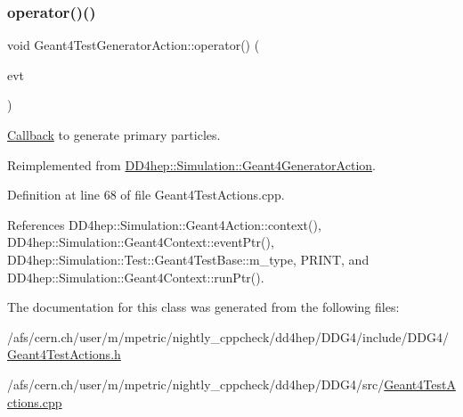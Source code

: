 \subsubsection{\texorpdfstring{operator()()}{operator()()}}
{\footnotesize\ttfamily void Geant4\+Test\+Generator\+Action\+::operator() (\begin{DoxyParamCaption}\item[{G4\+Event $\ast$}]{evt }\end{DoxyParamCaption})\hspace{0.3cm}{\ttfamily [virtual]}}



\hyperlink{class_d_d4hep_1_1_callback}{Callback} to generate primary particles. 



Reimplemented from \hyperlink{class_d_d4hep_1_1_simulation_1_1_geant4_generator_action_ac5a1d2335a19e3f9d555081199e01801}{D\+D4hep\+::\+Simulation\+::\+Geant4\+Generator\+Action}.



Definition at line 68 of file Geant4\+Test\+Actions.\+cpp.



References D\+D4hep\+::\+Simulation\+::\+Geant4\+Action\+::context(), D\+D4hep\+::\+Simulation\+::\+Geant4\+Context\+::event\+Ptr(), D\+D4hep\+::\+Simulation\+::\+Test\+::\+Geant4\+Test\+Base\+::m\+\_\+type, P\+R\+I\+NT, and D\+D4hep\+::\+Simulation\+::\+Geant4\+Context\+::run\+Ptr().



The documentation for this class was generated from the following files\+:\begin{DoxyCompactItemize}
\item 
/afs/cern.\+ch/user/m/mpetric/nightly\+\_\+cppcheck/dd4hep/\+D\+D\+G4/include/\+D\+D\+G4/\hyperlink{_geant4_test_actions_8h}{Geant4\+Test\+Actions.\+h}\item 
/afs/cern.\+ch/user/m/mpetric/nightly\+\_\+cppcheck/dd4hep/\+D\+D\+G4/src/\hyperlink{_geant4_test_actions_8cpp}{Geant4\+Test\+Actions.\+cpp}\end{DoxyCompactItemize}
